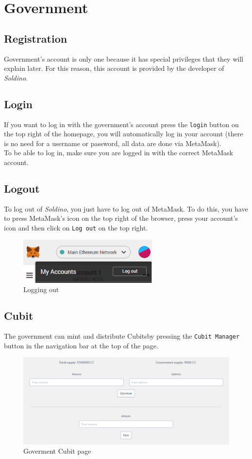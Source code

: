 \section{Government}
	\subsection{Registration}
	Government's account is only one because it has special privileges that
	they will explain later. For this reason, this account is provided 
	by the developer of \textit{Soldino}.
	\subsection{Login}
	If you want to log in with the government's account press the \texttt{login} button on the 
	top right of the homepage, you will automatically log in your account 
	(there is no need for a username or password, all data are done via MetaMask). 
	\\To be able to log in, make sure you are logged in with the correct MetaMask\glosp 
	account.
	\subsection{Logout}
	To log out of \textit{Soldino}, you just have to log out of 
	MetaMask\glosp. To do this, you have to press MetaMask's icon on the top 
	right of the browser, press your account's icon and then click on \texttt{Log out}
	on the top right.
	\begin{figure}[H]
		\includegraphics[width=7cm]{res/images/logout_metamask.png}
		\centering
		\caption{Logging out}
	\end{figure}
\pagebreak
	\subsection{Cubit}
	The government can mint and distribute Cubits\glosp by pressing the \texttt{Cubit 
	Manager} button in the navigation bar at the top of the page.
	\begin{figure}[H]
		\includegraphics[width=15cm]{res/images/cubit_mint.png}
		\centering
		\caption{Goverment Cubit page}
	\end{figure}
